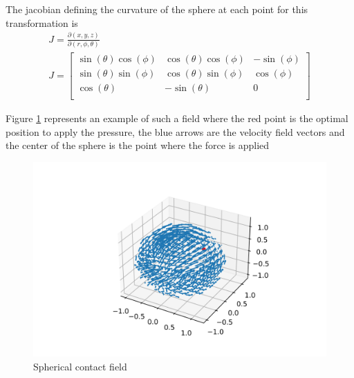 The jacobian defining the curvature of the sphere at each point for this transformation is 
\begin{align}
    J = \frac{\partial{(x,y,z)}}{\partial{(r,\phi,\theta)}} \nonumber\\
    J = \begin{bmatrix}
        \sin(\theta)\cos(\phi) & \cos(\theta)\cos(\phi) & -\sin(\phi)\\
        \sin(\theta)\sin(\phi) & \cos(\theta)\sin(\phi) & \cos(\phi)\\
        \cos(\theta) & -\sin(\theta) & 0\\
        \end{bmatrix}
        \label{jacobian}
\end{align}

Figure \ref{fig:spherical} represents an example of such a field where the red point is the optimal position to apply the pressure, the blue arrows are the velocity field vectors and the center of the sphere is the point where the force is applied

\begin{figure}[h!]
    \centering
    \includegraphics[width=\linewidth]{Images/sphericalfield.png}
    \caption{Spherical contact field}
    \label{fig:spherical}
\end{figure}
